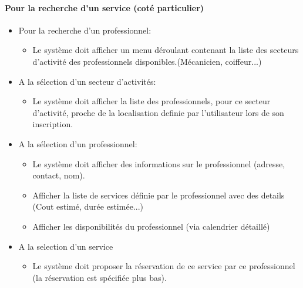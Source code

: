 \documentclass{article}
\begin{document}
\paragraph{Pour la recherche d'un service (coté particulier)}
\begin{itemize}
\item Pour la recherche d'un professionnel:
	\begin{itemize}
	\item Le système doit afficher un menu déroulant contenant la liste des secteurs d'activité des professionnels 
	disponibles.(Mécanicien, coiffeur...)
	\end{itemize}
\item A la sélection d'un secteur d'activités:
	\begin{itemize}
	\item Le système doit afficher la liste des professionnels, pour ce secteur d'activité, proche 
		de la localisation definie par l'utilisateur lors de son inscription.
	\end{itemize}
\item A la sélection d'un professionnel:
	\begin{itemize}
	\item Le système doit afficher des informations sur le professionnel (adresse, contact, nom).
	\item Afficher la liste de services définie par le professionnel avec des details (Cout estimé, durée estimée...)
	\item Afficher les disponibilités du professionnel (via calendrier détaillé)
	\end{itemize}
\item A la selection d'un service
	\begin{itemize}
	\item Le système doit proposer la réservation de ce service par ce professionnel (la réservation est spécifiée plus bas).
	\end{itemize}
\end{itemize}
\end{document}
